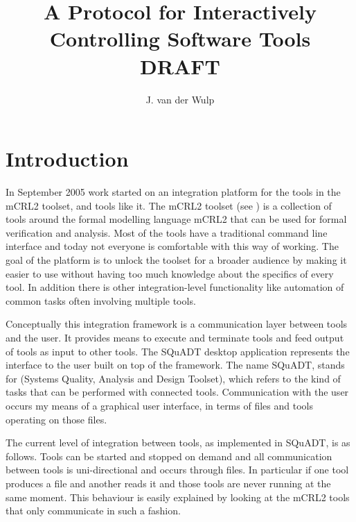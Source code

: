\documentclass{article}
\title{A Protocol for Interactively Controlling Software Tools\\DRAFT}
\author{J. van der Wulp}
\newcommand{\squadt}{SQuADT\xspace}
\begin{document}
\maketitle
\thispagestyle{empty}

 \section{Introduction}

  In September 2005 work started on an integration platform for the tools in
  the mCRL2 toolset, and tools like it. The mCRL2 toolset (see
  \cite{groote_et_al:DSP:2007:862}) is a collection of tools around the formal
  modelling language mCRL2 that can be used for formal verification and analysis.
  Most of the tools have a traditional command line interface and today not
  everyone is comfortable with this way of working.  The goal of the platform
  is to unlock the toolset for a broader audience by making it easier to use
  without having too much knowledge about the specifics of every tool. In
  addition there is other integration-level functionality like automation of
  common tasks often involving multiple tools.
  
  Conceptually this integration framework is a communication layer between
  tools and the user. It provides means to execute and terminate tools and feed
  output of tools as input to other tools. The \squadt desktop application
  represents the interface to the user built on top of the framework. The name
  \squadt, stands for (Systems Quality, Analysis and Design Toolset), which
  refers to the kind of tasks that can be performed with connected tools.
  Communication with the user occurs my means of a graphical user interface, in
  terms of files and tools operating on those files.
  
  The current level of integration between tools, as implemented in \squadt, is
  as follows. Tools can be started and stopped on demand and all communication
  between tools is uni-directional and occurs through files. In particular if
  one tool produces a file and another reads it and those tools are never
  running at the same moment. This behaviour is easily explained by looking at
  the mCRL2 tools that only communicate in such a fashion.
\end{document}
